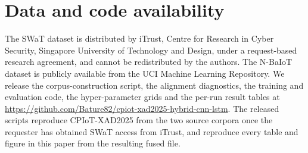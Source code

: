 \section*{Data and code availability}
The SWaT dataset is distributed by iTrust, Centre for Research in Cyber
Security, Singapore University of Technology and Design, under a request-based
research agreement, and cannot be redistributed by the authors. The N-BaIoT
dataset is publicly available from the UCI Machine Learning Repository. We
release the corpus-construction script, the alignment diagnostics, the
training and evaluation code, the hyper-parameter grids and the per-run result
tables at \url{https://github.com/Bature82/cpiot-xad2025-hybrid-cnn-lstm}. The
released scripts reproduce CPIoT-XAD2025 from the two source corpora once the
requester has obtained SWaT access from iTrust, and reproduce every table and
figure in this paper from the resulting fused file.

